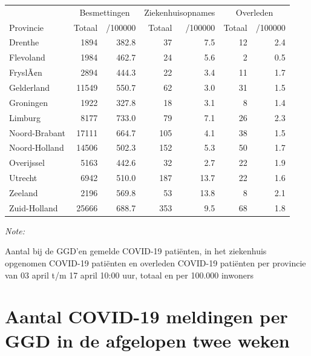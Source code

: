 \documentclass[
  english,
  man,floatsintext]{apa6}
\begin{document}
\begin{table}
\centering
\begin{threeparttable}
\begin{tabular}{lrrrrrr}
\toprule
\multicolumn{1}{c}{ } & \multicolumn{2}{c}{Besmettingen} & \multicolumn{2}{c}{Ziekenhuisopnames} & \multicolumn{2}{c}{Overleden} \\
\cmidrule(l{3pt}r{3pt}){2-3} \cmidrule(l{3pt}r{3pt}){4-5} \cmidrule(l{3pt}r{3pt}){6-7}
Provincie & Totaal & /100000 & Totaal & /100000 & Totaal & /100000\\
\midrule
Drenthe & 1894 & 382.8 & 37 & 7.5 & 12 & 2.4\\
Flevoland & 1984 & 462.7 & 24 & 5.6 & 2 & 0.5\\
FryslÃ¢n & 2894 & 444.3 & 22 & 3.4 & 11 & 1.7\\
Gelderland & 11549 & 550.7 & 62 & 3.0 & 31 & 1.5\\
Groningen & 1922 & 327.8 & 18 & 3.1 & 8 & 1.4\\
Limburg & 8177 & 733.0 & 79 & 7.1 & 26 & 2.3\\
Noord-Brabant & 17111 & 664.7 & 105 & 4.1 & 38 & 1.5\\
Noord-Holland & 14506 & 502.3 & 152 & 5.3 & 50 & 1.7\\
Overijssel & 5163 & 442.6 & 32 & 2.7 & 22 & 1.9\\
Utrecht & 6942 & 510.0 & 187 & 13.7 & 22 & 1.6\\
Zeeland & 2196 & 569.8 & 53 & 13.8 & 8 & 2.1\\
Zuid-Holland & 25666 & 688.7 & 353 & 9.5 & 68 & 1.8\\
\bottomrule
\end{tabular}
\begin{tablenotes}
\item \textit{Note: } 
\item Aantal bij de GGD’en gemelde COVID-19 patiënten, in het ziekenhuis opgenomen COVID-19 patiënten en overleden COVID-19 patiënten per provincie van 03 april t/m 17 april 10:00 uur, totaal en per 100.000 inwoners
\end{tablenotes}
\end{threeparttable}
\end{table}

\newpage

\hypertarget{aantal-covid-19-meldingen-per-ggd-in-de-afgelopen-twee-weken}{%
\section{Aantal COVID-19 meldingen per GGD in de afgelopen twee weken}\label{aantal-covid-19-meldingen-per-ggd-in-de-afgelopen-twee-weken}}
\end{document}
